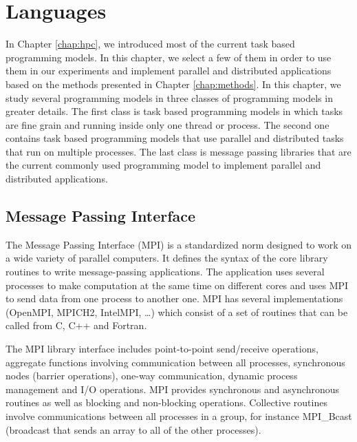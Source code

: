 \chapter{Languages}
\label{chap:languages}
\graphicspath{{chapters/languages/}}



In Chapter \ref{chap:hpc}, we introduced most of the current task based programming models.
In this chapter, we select a few of them in order to use them in our experiments and implement parallel and distributed applications based on the methods presented in Chapter \ref{chap:methods}.
In this chapter, we study several programming models in three classes of programming models in greater details.
The first class is task based programming models in which tasks are fine grain and running inside only one thread or process.
The second one contains task based programming models that use parallel and distributed tasks that run on multiple processes.
The last class is message passing libraries that are the current commonly used programming model to implement parallel and distributed applications.

\section{Message Passing Interface}
The Message Passing Interface (MPI) \cite{MPIForum} is a standardized norm designed to work on a wide variety of parallel computers.
It defines the syntax of the core library routines to write message-passing applications.
The application uses several processes to make computation at the same time on different cores and uses MPI to send data from one process to another one.
MPI has several implementations (OpenMPI, MPICH2, IntelMPI, \dots) which consist of a set of routines that can be called from C, C++ and Fortran.

The MPI library interface includes point-to-point send/receive operations, aggregate functions involving communication between all processes, synchronous nodes (barrier operations), one-way communication, dynamic process management and I/O operations.
MPI provides synchronous and asynchronous routines as well as blocking and non-blocking operations.
Collective routines involve communications between all processes in a group, for instance MPI\_Bcast (broadcast that sends an array to all of the other processes).

